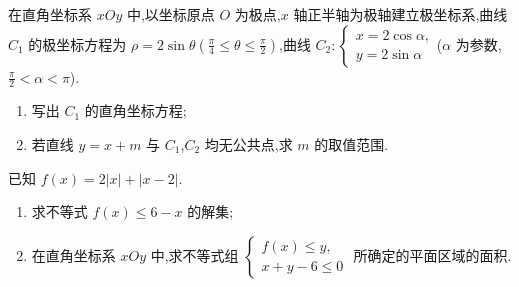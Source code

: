 \begin{problem}
在直角坐标系 \(xOy\) 中,以坐标原点 \(O\) 为极点,\(x\) 轴正半轴为极轴建立极坐标系,曲线 \(C_1\) 的极坐标方程为 \(\rho=2\sin\theta\left(\frac\pi4\le\theta\le\frac\pi2\right)\),曲线 \(C_2:\begin{cases}
x=2\cos\alpha,\\
y=2\sin\alpha
\end{cases}\)(\(\alpha\) 为参数,\(\frac\pi2<\alpha<\pi\)).
\begin{enumerate}
\item 写出 \(C_1\) 的直角坐标方程;
\item 若直线 \(y=x+m\) 与 \(C_1\),\(C_2\) 均无公共点,求 \(m\) 的取值范围.
\end{enumerate}

\end{problem}

\begin{problem}
已知 \(f(x)=2|x|+|x-2|\).
\begin{enumerate}
\item 求不等式 \(f(x)\le6-x\) 的解集;
\item 在直角坐标系 \(xOy\) 中,求不等式组 \(\begin{cases}
f(x)\le y,\\
x+y-6\le0
\end{cases}\) 所确定的平面区域的面积.
\end{enumerate}

\end{problem}
